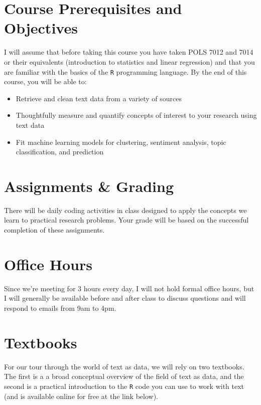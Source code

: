 \documentclass[11pt, letterpaper]{article}
\begin{document}
\section*{Course Prerequisites and Objectives}
I will assume that before taking this course you have taken POLS 7012 and 7014 or their equivalents (introduction to statistics and linear regression) and that you are familiar with the basics of the \texttt{R} programming language. By the end of this course, you will be able to:
\begin{itemize}
	\item Retrieve and clean text data from a variety of sources
	\item Thoughtfully measure and quantify concepts of interest to your research using text data
	\item Fit machine learning models for clustering, sentiment analysis, topic classification, and prediction
\end{itemize}


\section*{Assignments \& Grading}

There will be daily coding activities in class designed to apply the concepts we learn to practical research problems. Your grade will be based on the successful completion of these assignments.

\section*{Office Hours}

Since we're meeting for 3 hours every day, I will not hold formal office hours, but I will generally be available before and after class to discuss questions and will respond to emails from 9am to 4pm.

\section*{Textbooks}

For our tour through the world of text as data, we will rely on two textbooks. The first is a a broad conceptual overview of the field of text as data, and the second is a practical introduction to the \texttt{R} code you can use to work with text (and is available online for free at the link below).
\end{document}
